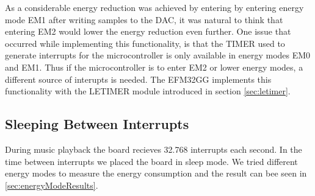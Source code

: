 As a considerable energy reduction was achieved by entering by entering energy mode EM1 after writing samples to the DAC, it was natural to think that entering EM2 would lower the energy reduction even further. One issue that occurred while implementing this functionality, is that the TIMER used to generate interrupts for the microcontroller is only available in energy modes EM0 and EM1. Thus if the microcontroller is to enter EM2 or lower energy modes, a different source of interupts is needed. The EFM32GG implements this functionality with the LETIMER module introduced in section \ref{sec:letimer}.

\subsection{Sleeping Between Interrupts}
During music playback the board recieves 32.768 interrupts each second. In the time between interrupts we placed the board in sleep mode. We tried different energy modes to measure the energy consumption and the result can bee seen in \ref{sec:energyModeResults}.
